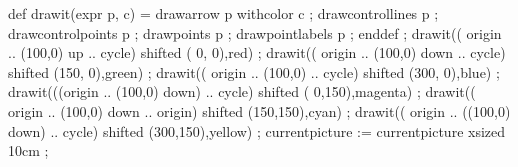\startMPpage
    def drawit(expr p, c) =
        drawarrow p withcolor c ;
        drawcontrollines p ;
        drawcontrolpoints p ;
        drawpoints p ;
        drawpointlabels p ;
    enddef ;
    drawit(( origin ..  (100,0) {up}    .. cycle)  shifted (  0,  0),red) ;
    drawit(( origin ..  (100,0) {down}  .. cycle)  shifted (150,  0),green) ;
    drawit(( origin ..  (100,0)         .. cycle)  shifted (300,  0),blue) ;
    drawit(((origin ..  (100,0) {down}) .. cycle)  shifted (  0,150),magenta) ;
    drawit(( origin ..  (100,0) {down}  .. origin) shifted (150,150),cyan) ;
    drawit(( origin .. ((100,0) {down}) .. cycle)  shifted (300,150),yellow) ;
    currentpicture := currentpicture xsized 10cm ;
\stopMPpage
